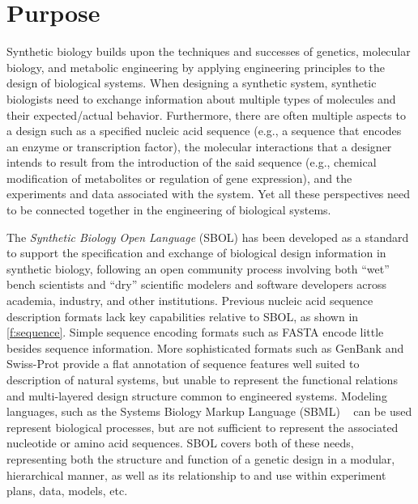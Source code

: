 \section{Purpose}

Synthetic biology builds upon the techniques and successes of genetics, molecular biology, and metabolic engineering by applying engineering principles to the design of biological systems. 
When designing a synthetic system, synthetic biologists need to exchange information about multiple types of molecules and their expected/actual behavior.
Furthermore, there are often multiple aspects to a design such as a specified nucleic acid sequence (e.g., a sequence that encodes an enzyme or transcription factor), the molecular interactions that a designer intends to result from the introduction of the said sequence (e.g., chemical modification of metabolites or regulation of gene expression), and the experiments and data associated with the system. Yet all these perspectives need to be connected together in the engineering of biological systems.

The \emph{Synthetic Biology Open Language} (SBOL) has been developed as a standard to support the specification and exchange of biological design information in synthetic biology, 
following an open community process involving both ``wet'' bench scientists and ``dry'' scientific modelers and software developers across academia, industry, and other institutions.
Previous nucleic acid sequence description formats lack key capabilities relative to SBOL, as shown in \ref{f:sequence}. 
Simple sequence encoding formats such as FASTA encode little besides sequence information. 
More sophisticated formats such as GenBank and Swiss-Prot provide a flat annotation of sequence features well suited to description of natural systems, but unable to represent the functional relations and multi-layered design structure common to engineered systems.
Modeling languages, such as the Systems Biology Markup Language (SBML) ~\cite{SBML} can be used represent biological processes, but are not sufficient to represent the associated nucleotide or amino acid sequences.  
SBOL covers both of these needs, representing both the structure and function of a genetic design in a modular, hierarchical manner, as well as its relationship to and use within experiment plans, data, models, etc.

